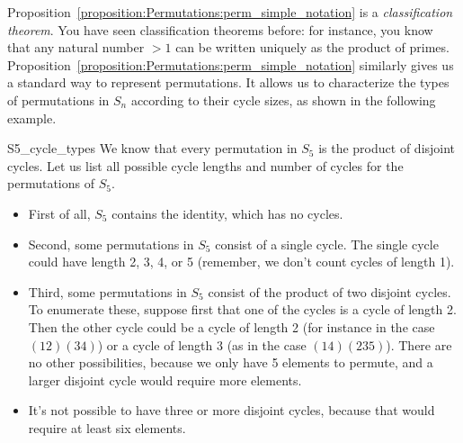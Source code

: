 Proposition~\ref{proposition:Permutations:perm_simple_notation} is a \emph{classification theorem}. You have seen classification theorems before: for instance, you know that any natural number $>1$ can be written uniquely as the product of primes.  Proposition~\ref{proposition:Permutations:perm_simple_notation} similarly gives us a standard way to represent permutations. It allows us to characterize the types of permutations in $S_n$ according to their cycle sizes, as shown in the following example.

\begin{example}{S5_cycle_types}
We know that every permutation in $S_5$ is the product of disjoint cycles. Let us list all  possible cycle lengths and number of cycles for the permutations of $S_5$.
\begin{itemize}
\item
First of all, $S_5$ contains the identity, which has no cycles.
\item
Second, some permutations in $S_5$ consist of a single cycle.  The single cycle could have length 2, 3, 4, or 5 (remember, we don't count cycles of length 1).
\item
Third, some permutations in $S_5$ consist of the product of two disjoint cycles. To enumerate these, suppose first that one of the cycles is a cycle of length 2. Then the other cycle could be a cycle of length 2 (for instance in the case $(12)(34)$) or a cycle of length 3 (as in the case $(14)(235)$). There are no other possibilities, because we only have 5 elements to permute, and a larger disjoint cycle would require more elements.
\item
It's not possible to have three or more disjoint cycles, because that would require at least six elements.
\end{itemize}



\end{example}
